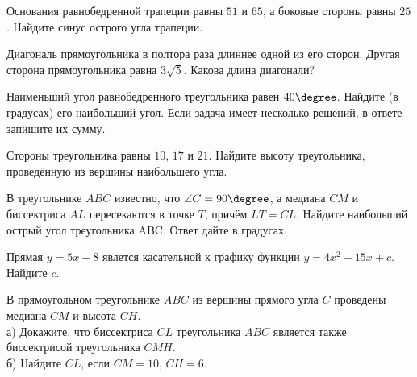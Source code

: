 \begin{homework}[number=2]
	\begin{listofex}
		\item Основания равнобедренной трапеции равны \( 51 \) и \( 65 \), а боковые стороны равны \( 25 \). Найдите синус острого угла трапеции.
		\item Диагональ прямоугольника в полтора раза длиннее одной из его сторон. Другая сторона прямоугольника равна \( 3\sqrt{5} \). Какова длина диагонали?
		\item Наименьший угол равнобедренного треугольника равен \( 40\degree \). Найдите (в градусах) его наибольший угол. Если задача
		имеет несколько решений, в ответе запишите их сумму.
		\item Стороны треугольника равны \( 10 \), \( 17 \) и \( 21 \). Найдите высоту треугольника, проведённую из вершины наибольшего угла.
		\item В треугольнике \( ABC \) известно, что \( \angle C = 90\degree \),
		а медиана \( CM \) и биссектриса \( AL \) пересекаются в точке \( T \), причём \( LT = CL \).
		Найдите наибольший острый угол треугольника ABC.
		Ответ дайте в градусах.
		\item Прямая \( y=5x-8 \) явлется касательной к графику функции \( y=4x^2-15x+c \). Найдите \( c \).
		\item В прямоугольном треугольнике \( ABC \) из вершины прямого
		угла \( C \) проведены медиана \( CM \) и высота \( CH \).\\
		а) Докажите, что биссектриса \( CL \) треугольника \( ABC \) является
		также биссектрисой треугольника \( CMH \).\\
		б) Найдите \( CL \), если \( CM = 10 \), \( CH = 6 \).
		\item {}
		\item {}
	\end{listofex}
\end{homework}

